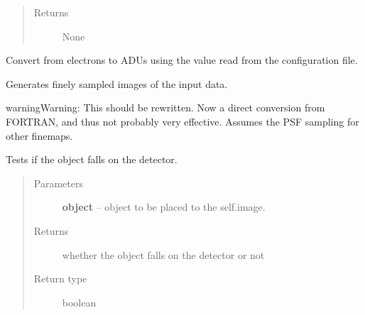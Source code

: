 \documentclass[a4paper,12pt,english]{sphinxmanual}
\begin{document}
\begin{fulllineitems}
\begin{fulllineitems}
\begin{quote}
\begin{description}
\item[{Returns}] \leavevmode
None

\end{description}\end{quote}

\end{fulllineitems}


\begin{fulllineitems}
\label{simulator:simulator.simulator.VISsimulator.electrons2ADU}
Convert from electrons to ADUs using the value read from the configuration file.

\end{fulllineitems}


\begin{fulllineitems}
\label{simulator:simulator.simulator.VISsimulator.generateFinemaps}
Generates finely sampled images of the input data.

\begin{notice}{warning}{Warning:}
This should be rewritten. Now a direct conversion from FORTRAN, and thus
not probably very effective. Assumes the PSF sampling for other finemaps.
\end{notice}

\end{fulllineitems}


\begin{fulllineitems}
\label{simulator:simulator.simulator.VISsimulator.objectOnDetector}
Tests if the object falls on the detector.
\begin{quote}\begin{description}
\item[{Parameters}] \leavevmode
\textbf{object} -- object to be placed to the self.image.

\item[{Returns}] \leavevmode
whether the object falls on the detector or not

\item[{Return type}] \leavevmode
boolean


\end{description}
\end{quote}
\end{fulllineitems}
\end{fulllineitems}
\end{document}

